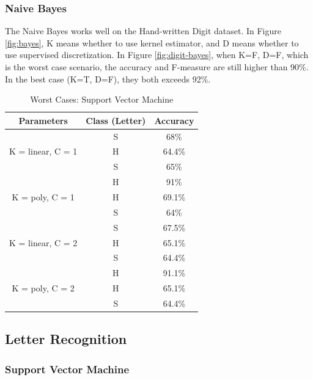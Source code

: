 \documentclass[11pt]{article}
\begin{document}
\subsubsection{Naive Bayes}
The Naive Bayes works well on the Hand-written Digit dataset. In Figure \ref{fig:bayes}, K means whether to use kernel estimator, and D means whether to use supervised discretization. In Figure \ref{fig:digit-bayes}, when K=F, D=F, which is the worst case scenario, the accuracy and F-measure are still higher than 90\%. In the best case (K=T, D=F), they both exceeds 92\%.

\begin{table}[!htb]

\centering
\begin{minipage}{0.46\columnwidth}
\begin{tabular}{c  c  c} \hline

Parameters & Class (Letter) & Accuracy \\\hline
\multirow{3}{*}{K = linear, C = 1} & S & 68\% \\
	& H & 64.4\% \\
	& S & 65\% \\\hline
\multirow{3}{*}{K = poly, C = 1} & H & 91\% \\
	& H & 69.1\% \\
	& S & 64\% \\\hline
\multirow{3}{*}{K = linear, C = 2} & S & 67.5\% \\
	& H & 65.1\% \\
	& S & 64.4\% \\\hline
\multirow{3}{*}{K = poly, C = 2} & H & 91.1\% \\
	& H & 65.1\% \\
	& S & 64.4\% \\\hline
\end{tabular}
\caption{Worst Cases: Support Vector Machine} %
\label{tbl:svm}
\end{minipage}
\hfill

\end{table}


\subsection{Letter Recognition}
\subsubsection{Support Vector Machine}
\end{document}
